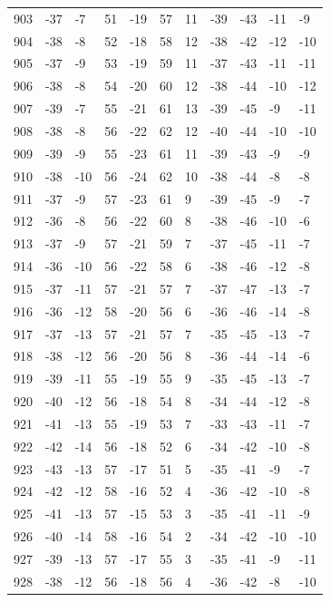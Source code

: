 \begin{table}[H]
\begin{tabular}{lllllllllll}
903 & -37 & -7 & 51 & -19 & 57 & 11 & -39 & -43 & -11 & -9 \\
904 & -38 & -8 & 52 & -18 & 58 & 12 & -38 & -42 & -12 & -10 \\
905 & -37 & -9 & 53 & -19 & 59 & 11 & -37 & -43 & -11 & -11 \\
906 & -38 & -8 & 54 & -20 & 60 & 12 & -38 & -44 & -10 & -12 \\
907 & -39 & -7 & 55 & -21 & 61 & 13 & -39 & -45 & -9 & -11 \\
908 & -38 & -8 & 56 & -22 & 62 & 12 & -40 & -44 & -10 & -10 \\
909 & -39 & -9 & 55 & -23 & 61 & 11 & -39 & -43 & -9 & -9 \\
910 & -38 & -10 & 56 & -24 & 62 & 10 & -38 & -44 & -8 & -8 \\
911 & -37 & -9 & 57 & -23 & 61 & 9 & -39 & -45 & -9 & -7 \\
912 & -36 & -8 & 56 & -22 & 60 & 8 & -38 & -46 & -10 & -6 \\
913 & -37 & -9 & 57 & -21 & 59 & 7 & -37 & -45 & -11 & -7 \\
914 & -36 & -10 & 56 & -22 & 58 & 6 & -38 & -46 & -12 & -8 \\
915 & -37 & -11 & 57 & -21 & 57 & 7 & -37 & -47 & -13 & -7 \\
916 & -36 & -12 & 58 & -20 & 56 & 6 & -36 & -46 & -14 & -8 \\
917 & -37 & -13 & 57 & -21 & 57 & 7 & -35 & -45 & -13 & -7 \\
918 & -38 & -12 & 56 & -20 & 56 & 8 & -36 & -44 & -14 & -6 \\
919 & -39 & -11 & 55 & -19 & 55 & 9 & -35 & -45 & -13 & -7 \\
920 & -40 & -12 & 56 & -18 & 54 & 8 & -34 & -44 & -12 & -8 \\
921 & -41 & -13 & 55 & -19 & 53 & 7 & -33 & -43 & -11 & -7 \\
922 & -42 & -14 & 56 & -18 & 52 & 6 & -34 & -42 & -10 & -8 \\
923 & -43 & -13 & 57 & -17 & 51 & 5 & -35 & -41 & -9 & -7 \\
924 & -42 & -12 & 58 & -16 & 52 & 4 & -36 & -42 & -10 & -8 \\
925 & -41 & -13 & 57 & -15 & 53 & 3 & -35 & -41 & -11 & -9 \\
926 & -40 & -14 & 58 & -16 & 54 & 2 & -34 & -42 & -10 & -10 \\
927 & -39 & -13 & 57 & -17 & 55 & 3 & -35 & -41 & -9 & -11 \\
928 & -38 & -12 & 56 & -18 & 56 & 4 & -36 & -42 & -8 & -10 \\

\end{tabular}
\end{table}
